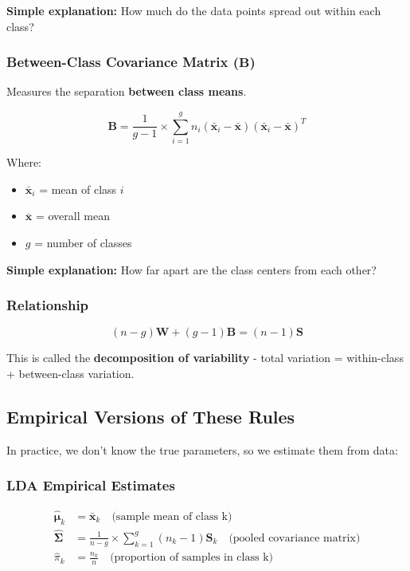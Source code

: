 \documentclass[12pt,a4paper]{article}
\begin{document}
\textbf{Simple explanation:} How much do the data points spread out within each class?

\subsubsection{Between-Class Covariance Matrix ($\mathbf{B}$)}

Measures the separation \textbf{between class means}.

\begin{equation}
\mathbf{B} = \frac{1}{g-1} \times \sum_{i=1}^{g} n_i(\bar{\mathbf{x}}_i - \bar{\mathbf{x}})(\bar{\mathbf{x}}_i - \bar{\mathbf{x}})^T
\end{equation}

Where:
\begin{itemize}
    \item $\bar{\mathbf{x}}_i$ = mean of class $i$
    \item $\bar{\mathbf{x}}$ = overall mean
    \item $g$ = number of classes
\end{itemize}

\textbf{Simple explanation:} How far apart are the class centers from each other?

\subsubsection{Relationship}

\begin{equation}
\boxed{(n-g)\mathbf{W} + (g-1)\mathbf{B} = (n-1)\mathbf{S}}
\end{equation}

This is called the \textbf{decomposition of variability} - total variation = within-class + between-class variation.

\subsection{Empirical Versions of These Rules}

In practice, we don't know the true parameters, so we estimate them from data:

\subsubsection{LDA Empirical Estimates}

\begin{align}
\hat{\boldsymbol{\mu}}_k &= \bar{\mathbf{x}}_k \quad \text{(sample mean of class k)} \\
\hat{\boldsymbol{\Sigma}} &= \frac{1}{n-g} \times \sum_{k=1}^{g}(n_k-1)\mathbf{S}_k \quad \text{(pooled covariance matrix)} \\
\hat{\pi}_k &= \frac{n_k}{n} \quad \text{(proportion of samples in class k)}
\end{align}
\end{document}

